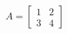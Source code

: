 \documentclass[preview]{standalone}
\begin{document}
\begin{align*}
A = \begin{bmatrix} 1 & 2 \\ 3 & 4 \end{bmatrix}
\end{align*}
\end{document}

